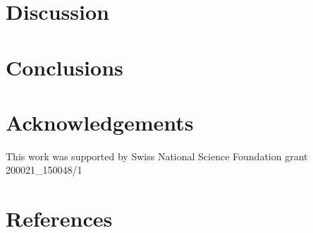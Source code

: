 \documentclass[preprint,12pt]{elsarticle}
\begin{document}
%
%
%
%
%


\section{Discussion}
\label{sec:discussion}

%
%
%
%
%

\section{Conclusions}
\label{sec:conclusions}

%
%
%
%
%

\section*{Acknowledgements}
\label{sec:ack}

This work was supported by Swiss National Science Foundation grant 200021\_150048/1

%
%
%
%
%

\section*{References}


\end{document}
